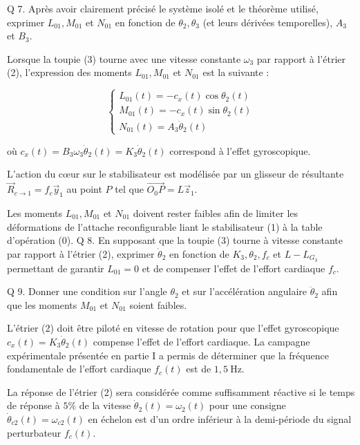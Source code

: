 Q 7. Après avoir clairement précisé le système isolé et le théorème utilisé, exprimer $L_{01}, M_{01}$ et $N_{01}$ en fonction de $\theta_{2}, \theta_{3}$ (et leurs dérivées temporelles), $A_{3}$ et $B_{3}$.

Lorsque la toupie (3) tourne avec une vitesse constante $\omega_{3}$ par rapport à l'étrier (2), l'expression des moments $L_{01}, M_{01}$ et $N_{01}$ est la suivante :

$$
\left\{\begin{array}{l}
L_{01}(t)=-c_{x}(t) \cos \theta_{2}(t) \\
M_{01}(t)=-c_{x}(t) \sin \theta_{2}(t) \\
N_{01}(t)=A_{3} \ddot{\theta}_{2}(t)
\end{array}\right.
$$

où $c_{x}(t)=B_{3} \omega_{3} \dot{\theta}_{2}(t)=K_{3} \dot{\theta}_{2}(t)$ correspond à l'effet gyroscopique.

L'action du cœur sur le stabilisateur est modélisée par un glisseur de résultante $\vec{R}_{c \rightarrow 1}=f_{c} \vec{y}_{1}$ au point $P$ tel que $\overrightarrow{O_{0} P}=L \vec{z}_{1}$.

Les moments $L_{01}, M_{01}$ et $N_{01}$ doivent rester faibles afin de limiter les déformations de l'attache reconfigurable liant le stabilisateur (1) à la table d'opération (0). Q 8. En supposant que la toupie (3) tourne à vitesse constante par rapport à l'étrier (2), exprimer $\dot{\theta}_{2}$ en fonction de $K_{3}, \theta_{2}, f_{c}$ et $L-L_{G_{3}}$ permettant de garantir $L_{01}=0$ et de compenser l'effet de l'effort cardiaque $f_{c}$.

Q 9. Donner une condition sur l'angle $\theta_{2}$ et sur l'accélération angulaire $\ddot{\theta}_{2}$ afin que les moments $M_{01}$ et $N_{01}$ soient faibles.

L'étrier (2) doit être piloté en vitesse de rotation pour que l'effet gyroscopique $c_{x}(t)=K_{3} \dot{\theta}_{2}(t)$ compense l'effet de l'effort cardiaque. La campagne expérimentale présentée en partie I a permis de déterminer que la fréquence fondamentale de l'effort cardiaque $f_{c}(t)$ est de $1,5 \mathrm{~Hz}$.

La réponse de l'étrier (2) sera considérée comme suffisamment réactive si le temps de réponse à $5 \%$ de la vitesse $\dot{\theta}_{2}(t)=\omega_{2}(t)$ pour une consigne $\dot{\theta}_{c 2}(t)=\omega_{c 2}(t)$ en échelon est d'un ordre inférieur à la demi-période du signal perturbateur $f_{c}(t)$.


